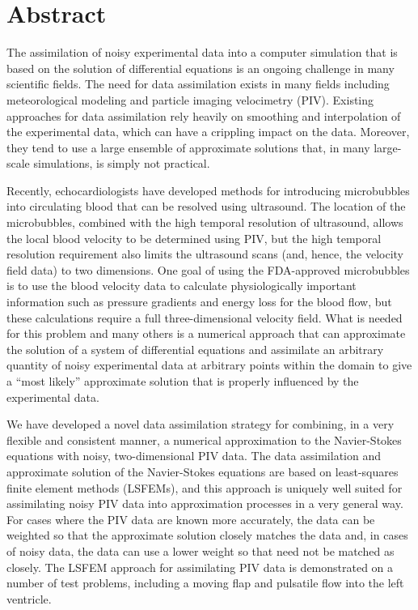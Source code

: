 \documentclass[article,A4,11pt]{llncs}%
\begin{document}
\section*{Abstract}
The assimilation of noisy experimental data into a computer simulation that is based on the solution of differential equations is an ongoing challenge in many scientific fields. The need for data assimilation exists in many fields including meteorological modeling and particle imaging velocimetry (PIV). Existing approaches for data assimilation rely heavily on smoothing and interpolation of the experimental data, which can have a crippling impact on the data. Moreover, they tend to use a large ensemble of approximate solutions that, in many large-scale simulations, is simply not practical.

Recently, echocardiologists have developed methods for introducing microbubbles into circulating blood that can be resolved using ultrasound. The location of the microbubbles, combined with the high temporal resolution of ultrasound, allows the local blood velocity to be determined using PIV, but the high temporal resolution requirement also limits the ultrasound scans (and, hence, the velocity field data) to two dimensions. One goal of using the FDA-approved microbubbles is to use the blood velocity data to calculate physiologically important information such as pressure gradients and energy loss for the blood flow, but these calculations require a full three-dimensional velocity field. What is needed for this problem and many others is a numerical approach that can approximate the solution of a system of differential equations and assimilate an arbitrary quantity of noisy experimental data at arbitrary points within the domain to give a “most likely” approximate solution that is properly influenced by the experimental data.

We have developed a novel data assimilation strategy for combining, in a very flexible and consistent manner, a numerical approximation to the Navier-Stokes equations with noisy, two-dimensional PIV data. The data assimilation and approximate solution of the Navier-Stokes equations are based on least-squares finite element methods (LSFEMs), and this approach is uniquely well suited for assimilating noisy PIV data into approximation processes in a very general way. For cases where the PIV data are known more accurately, the data can be weighted so that the approximate solution closely matches the data and, in cases of noisy data, the data can use a lower weight so that need not be matched as closely. The LSFEM approach for assimilating PIV data is demonstrated on a number of test problems, including a moving flap and pulsatile flow into the left ventricle.
\end{document}
